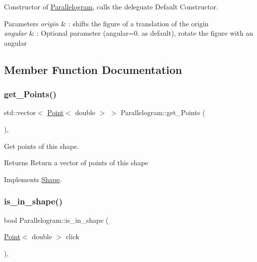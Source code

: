 Constructor of \hyperlink{classParallelogram}{Parallelogram}, calls the deleguate Default Constructor. 


\begin{DoxyParams}{Parameters}
{\em origin} & \+: shifts the figure of a translation of the origin \\
\hline
{\em angular} & \+: Optional parameter (angular=0. as default), rotate the figure with an angular \\
\hline
\end{DoxyParams}


\subsection{Member Function Documentation}
\mbox{\label{classParallelogram_a17c9986712806a8b07d90e444e0a543d}} 
\subsubsection{\texorpdfstring{get\+\_\+\+Points()}{get\_Points()}}
{\footnotesize\ttfamily std\+::vector$<$ \hyperlink{classPoint}{Point}$<$ double $>$ $>$ Parallelogram\+::get\+\_\+\+Points (\begin{DoxyParamCaption}{ }\end{DoxyParamCaption})\hspace{0.3cm}{\ttfamily [override]}, {\ttfamily [virtual]}}



Get points of this shape. 

\begin{DoxyReturn}{Returns}
Return a vector of points of this shape 
\end{DoxyReturn}


Implements \hyperlink{classShape_add74a5c682840fa4a519242b1ddbd0b5}{Shape}.

\mbox{\label{classParallelogram_a9ba441d86d6311bba489e998c87dddf6}} 
\subsubsection{\texorpdfstring{is\+\_\+in\+\_\+shape()}{is\_in\_shape()}}
{\footnotesize\ttfamily bool Parallelogram\+::is\+\_\+in\+\_\+shape (\begin{DoxyParamCaption}\item[{\hyperlink{classPoint}{Point}$<$ double $>$}]{click }\end{DoxyParamCaption})\hspace{0.3cm}{\ttfamily [override]}, {\ttfamily [virtual]}}



